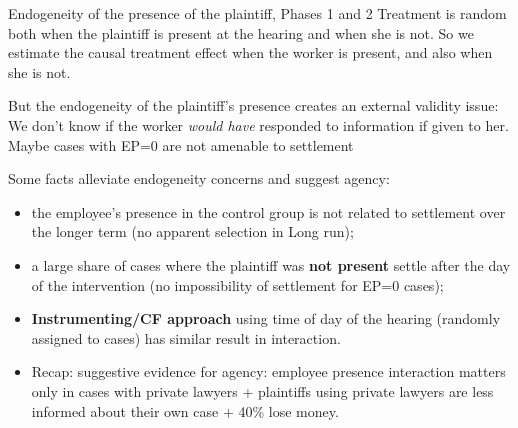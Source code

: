\documentclass[9pt]{beamer}
\begin{document}
 \begin{frame}{Endogeneity of the presence of the plaintiff, Phases 1 and 2}
 \label{frame_Control_Function}
    Treatment is random both when the plaintiff is present at the hearing and when she is not. So we estimate the causal treatment effect when the worker is present, and also when she is not.

    \vspace{.1in}
   But the endogeneity of the plaintiff's presence creates an external validity issue: %
   We don't know if the worker \textit{would have} responded to information if given to her. 
   \alert{Maybe cases with EP=0 are not amenable to settlement}
   
   \pause
   \vspace{.1in}
   Some facts alleviate endogeneity concerns and suggest agency:
   \pause
   \begin{itemize}
    \item the employee's presence in the control group is not related to settlement over the longer term (\alert{no apparent selection in Long run});
    \pause
       \item a large share of cases where the plaintiff was \textbf{not present} settle after the day of the intervention (\alert{no impossibility of settlement for EP=0 cases});
    \pause
       \item \textbf{Instrumenting/CF approach} using time of day of the hearing (randomly assigned to cases) has similar result in interaction. \hyperlink{frame_Table3E}{}
       \pause
       \item \alert{Recap: suggestive evidence for agency}: employee presence interaction matters only in cases with private lawyers + plaintiffs using private lawyers are less informed about their own case + 40\% lose money.
   \end{itemize}
   \pause
      \vspace{1mm}
      
\end{frame}
\end{document}
